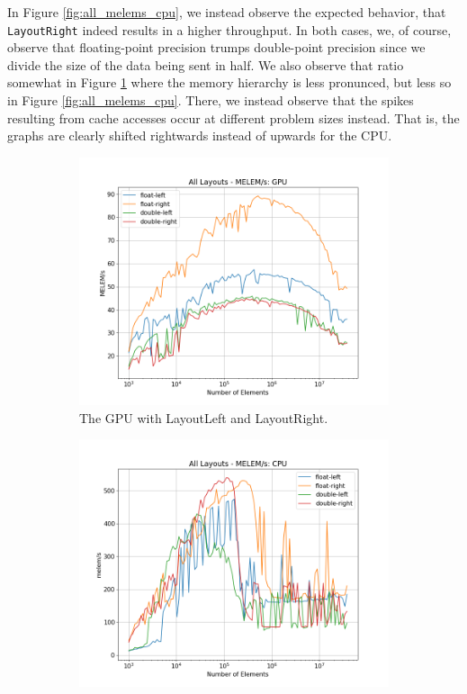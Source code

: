 \documentclass[10pt]{article}
\begin{document}
In Figure \ref{fig:all_melems_cpu}, we instead observe the expected behavior, that \texttt{LayoutRight} indeed results in a higher throughput. In both cases, we, of course, observe that floating-point precision trumps double-point precision since we divide the size of the data being sent in half. We also observe that ratio somewhat in Figure \ref{fig:all_melems_gpu} where the memory hierarchy is less pronunced, but less so in Figure \ref{fig:all_melems_cpu}. There, we instead observe that the spikes resulting from cache accesses occur at different problem sizes instead. That is, the graphs are clearly shifted rightwards instead of upwards for the CPU.
\begin{figure}[!ht]
    \centering
    \begin{subfigure}[b]{0.49\textwidth}
        \centering
        \includegraphics[width=\linewidth]{figs/all_melems_gpu.png}
        \caption{The GPU with LayoutLeft and LayoutRight.}
        \label{fig:all_melems_gpu}
    \end{subfigure}\hfill
    \begin{subfigure}[b]{0.49\textwidth}
        \centering
        \includegraphics[width=\linewidth]{figs/all_melems_cpu.png}

\end{subfigure}
\end{figure}
\end{document}
